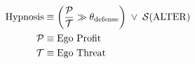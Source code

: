\begin{align}
    \mathrm{Hypnosis} &\equiv \left( \frac{\mathcal{P}}{\mathcal{T}} \gg \theta_{\mathrm{defense}} \right) \;\lor\; \mthAlteredState \\
    \mathcal{P} &\equiv \text{Ego Profit} \\
    \mathcal{T} &\equiv \text{Ego Threat}
\end{align}


